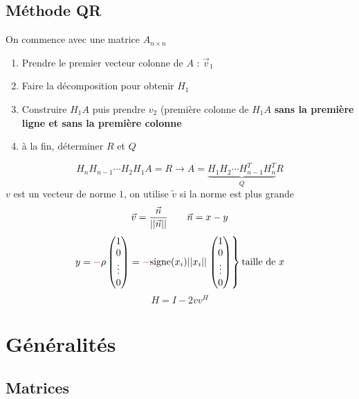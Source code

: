\documentclass[]{article}
\begin{document}
\begin{multicols}{3}
\subsection{Méthode QR}
On commence avec une matrice $A_{n\times n}$
\begin{enumerate}
\item Prendre le premier vecteur colonne de $A$ : $\vec{v}_1$
\item Faire la décomposition pour obtenir $H_1$
\item Construire $H_1A$ puis prendre $v_2$ (première colonne de $H_1A$ \textbf{sans la première ligne et sans la première colonne}
\item à la fin, déterminer $R$ et $Q$
\end{enumerate}
$$H_nH_{n-1}\cdots H_2H_1A=R\longrightarrow A=\underbrace{H_1H_2\cdots H_{n-1}^TH_n^T}_{Q}R$$
$v$ est un vecteur de norme $1$, on utilise $\tilde{v}$ si la norme est plus grande
$$\vec{v}=\frac{\vec{n}}{\abs{\abs{\vec{n}}}}\qquad \vec{n}=x-y$$
$$y=\textcolor{OrangeRed}{-}\rho\begin{pmatrix}
1\\0\\\vdots\\0
\end{pmatrix}=\textcolor{OrangeRed}{-}\text{signe}(x_i)\abs{\abs{x_i}}\left.\begin{pmatrix}
1\\0\\\vdots\\0
\end{pmatrix}\right\rbrace\text{taille de }x$$
$$H=I-2vv^{H}$$


\section{Généralités}
\subsection{Matrices}

\end{multicols}
\end{document}
